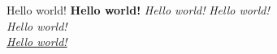\documentclass[12pt]{book}
\begin{document}
Hello world!\newline
\textbf{Hello world!}\newline
\emph{Hello world!}\newline
\textit{Hello world!}\\
\it{Hello world!}\\
\newpage
\Huge
\underline{Hello world!}
\end{document}
